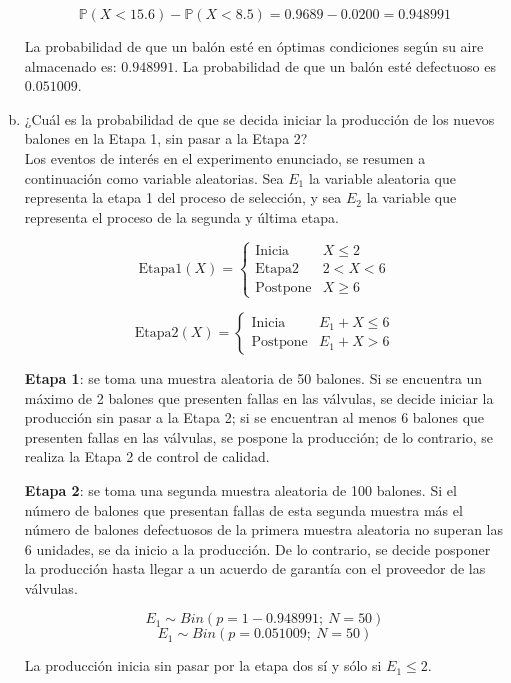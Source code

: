 \documentclass[11pt, spanish]{article}
\begin{document}
\begin{enumerate}[(a)]
$$\mathbb{P}(X < 15.6) - \mathbb{P}(X < 8.5) = 0.9689 - 0.0200 = 0.948991$$

La probabilidad de que un balón esté en óptimas condiciones según su aire almacenado es: $0.948991$. La probabilidad de que un balón esté defectuoso es $0.051009$.

\item ¿Cuál es la probabilidad de que se decida iniciar la producción de los nuevos
balones en la Etapa 1, sin pasar a la Etapa 2?\\

Los eventos de interés en el experimento enunciado, se resumen a continuación como variable aleatorias. Sea $E_{1}$ la variable aleatoria que representa la etapa 1 del proceso de selección, y sea $E_{2}$ la variable que representa el proceso de la segunda y última etapa.

\[ \mbox{Etapa1}(X) = \begin{cases} 
      \mbox{Inicia} & X \leq 2 \\
      \mbox{Etapa2} & 2 < X < 6 \\
      \mbox{Postpone} & X \geq 6
   \end{cases}
\]

\[ \mbox{Etapa2}(X) = \begin{cases} 
      \mbox{Inicia} & E_1 + X \leq 6 \\
      \mbox{Postpone} & E_1 + X > 6
   \end{cases}
\]

\textbf{Etapa 1}: se toma una muestra aleatoria de 50 balones. Si se encuentra un máximo de 2 balones que presenten fallas en las válvulas, se decide iniciar la producción sin pasar a la Etapa 2; si se encuentran al menos 6 balones que presenten fallas en las válvulas, se pospone la producción; de lo contrario, se realiza la Etapa 2 de control de calidad.

\textbf{Etapa 2}: se toma una segunda muestra aleatoria de 100 balones. Si el número de balones que presentan fallas de esta segunda muestra más el número de balones defectuosos de la primera muestra aleatoria no superan las 6 unidades, se da inicio a la producción. De lo contrario, se decide posponer la producción hasta llegar a un acuerdo de garantía con el proveedor de las válvulas.

$$E_1 \sim Bin(p = 1 - 0.948991;\ N = 50)$$
$$E_1 \sim Bin(p = 0.051009;\ N = 50)$$

La producción inicia sin pasar por la etapa dos sí y sólo si $E_1 \leq 2$. 


\end{enumerate}
\end{document}
